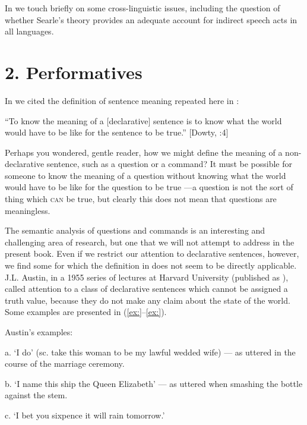 In  we touch briefly on some cross-linguistic issues, including the question of whether Searle’s theory provides an adequate account for indirect speech acts in all languages.


\section{2. Performatives}\footnotemark{}\label{sec:}

In  we cited the definition of sentence meaning repeated here in :


\ea
“To know the meaning of a [declarative] sentence is to know what the world would have to be like for the sentence to be true.”  [Dowty, \citealt{WallPeters1981}:4]
\z


Perhaps you wondered, gentle reader, how we might define the meaning of a non-declarative sentence, such as a question or a command? It must be possible for someone to know the meaning of a question without knowing what the world would have to be like for the question to be true —a question is not the sort of thing which \textsc{can} be true, but clearly this does not mean that questions are meaningless.



The semantic analysis of questions and commands is an interesting and challenging area of research, but one that we will not attempt to address in the present book. Even if we restrict our attention to declarative sentences, however, we find some for which the definition in  does not seem to be directly applicable. J.L. Austin, in a 1955 series of lectures at Harvard University (published as \citealt{Austin1962}), called attention to a class of declarative sentences which cannot be assigned a truth value, because they do not make any claim about the state of the world. Some examples are presented in (\ref{ex:}--\ref{ex:}).


Austin’s examples:

\ea
  a.  ‘I do’ (sc. take this woman to be my lawful wedded wife) — as uttered in the course of the marriage ceremony.
\z

\ea
  b.  ‘I name this ship the Queen Elizabeth’ — as uttered when smashing the bottle against the stem.
\z

\ea
  c.  ‘I bet you sixpence it will rain tomorrow.’
\z

